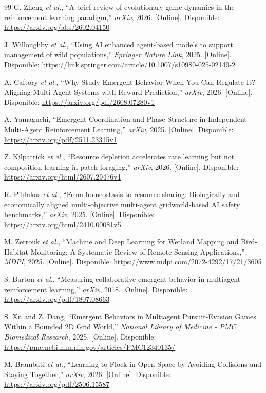 \documentclass[conference]{IEEEtran}
\begin{document}
\begin{thebibliography}{99}
G. Zheng \textit{et al.}, ``A brief review of evolutionary game dynamics in the reinforcement learning paradigm,'' \textit{arXiv}, 2026. [Online]. Disponible: \url{https://arxiv.org/abs/2602.04150}

J. Willoughby \textit{et al.}, ``Using AI enhanced agent-based models to support management of wild populations,'' \textit{Springer Nature Link}, 2025. [Online]. Disponible: \url{https://link.springer.com/article/10.1007/s10980-025-02149-2}

A. Caftory \textit{et al.}, ``Why Study Emergent Behavior When You Can Regulate It? Aligning Multi-Agent Systems with Reward Prediction,'' \textit{arXiv}, 2026. [Online]. Disponible: \url{https://arxiv.org/pdf/2608.07280v1}

A. Yamaguchi, ``Emergent Coordination and Phase Structure in Independent Multi-Agent Reinforcement Learning,'' \textit{arXiv}, 2025. [Online]. Disponible: \url{https://arxiv.org/pdf/2511.23315v1}

Z. Kilpatrick \textit{et al.}, ``Resource depletion accelerates rate learning but not composition learning in patch foraging,'' \textit{arXiv}, 2026. [Online]. Disponible: \url{https://arxiv.org/html/2607.29476v1}

R. Pihlakas \textit{et al.}, ``From homeostasis to resource sharing: Biologically and economically aligned multi-objective multi-agent gridworld-based AI safety benchmarks,'' \textit{arXiv}, 2025. [Online]. Disponible: \url{https://arxiv.org/html/2410.00081v5}

M. Zerrouk \textit{et al.}, ``Machine and Deep Learning for Wetland Mapping and Bird-Habitat Monitoring: A Systematic Review of Remote-Sensing Applications,'' \textit{MDPI}, 2025. [Online]. Disponible: \url{https://www.mdpi.com/2072-4292/17/21/3605}

S. Barton \textit{et al.}, ``Measuring collaborative emergent behavior in multiagent reinforcement learning,'' \textit{arXiv}, 2018. [Online]. Disponible: \url{https://arxiv.org/pdf/1807.08663}

S. Xu and Z. Dang, ``Emergent Behaviors in Multiagent Pursuit-Evasion Games Within a Bounded 2D Grid World,'' \textit{National Library of Medicine - PMC Biomedical Research}, 2025. [Online]. Disponible: \url{https://pmc.ncbi.nlm.nih.gov/articles/PMC12340135/}

M. Brambati \textit{et al.}, ``Learning to Flock in Open Space by Avoiding Collisions and Staying Together,'' \textit{arXiv}, 2026. [Online]. Disponible: \url{https://arxiv.org/pdf/2506.15587}


\end{thebibliography}
\end{document}
